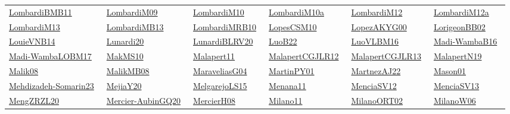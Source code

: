 \begin{longtable}{*{6}{l}}
\href{works/LombardiBMB11.pdf}{LombardiBMB11}~\cite{LombardiBMB11} & \href{works/LombardiM09.pdf}{LombardiM09}~\cite{LombardiM09} & \href{works/LombardiM10.pdf}{LombardiM10}~\cite{LombardiM10} & \href{works/LombardiM10a.pdf}{LombardiM10a}~\cite{LombardiM10a} & \href{works/LombardiM12.pdf}{LombardiM12}~\cite{LombardiM12} & \href{works/LombardiM12a.pdf}{LombardiM12a}~\cite{LombardiM12a}\\ 
\href{works/LombardiM13.pdf}{LombardiM13}~\cite{LombardiM13} & \href{}{LombardiMB13}~\cite{LombardiMB13} & \href{works/LombardiMRB10.pdf}{LombardiMRB10}~\cite{LombardiMRB10} & \href{works/LopesCSM10.pdf}{LopesCSM10}~\cite{LopesCSM10} & \href{works/LopezAKYG00.pdf}{LopezAKYG00}~\cite{LopezAKYG00} & \href{works/LorigeonBB02.pdf}{LorigeonBB02}~\cite{LorigeonBB02}\\ 
\href{works/LouieVNB14.pdf}{LouieVNB14}~\cite{LouieVNB14} & \href{works/Lunardi20.pdf}{Lunardi20}~\cite{Lunardi20} & \href{works/LunardiBLRV20.pdf}{LunardiBLRV20}~\cite{LunardiBLRV20} & \href{works/LuoB22.pdf}{LuoB22}~\cite{LuoB22} & \href{works/LuoVLBM16.pdf}{LuoVLBM16}~\cite{LuoVLBM16} & \href{works/Madi-WambaB16.pdf}{Madi-WambaB16}~\cite{Madi-WambaB16}\\ 
\href{works/Madi-WambaLOBM17.pdf}{Madi-WambaLOBM17}~\cite{Madi-WambaLOBM17} & \href{works/MakMS10.pdf}{MakMS10}~\cite{MakMS10} & \href{works/Malapert11.pdf}{Malapert11}~\cite{Malapert11} & \href{}{MalapertCGJLR12}~\cite{MalapertCGJLR12} & \href{works/MalapertCGJLR13.pdf}{MalapertCGJLR13}~\cite{MalapertCGJLR13} & \href{works/MalapertN19.pdf}{MalapertN19}~\cite{MalapertN19}\\ 
\href{works/Malik08.pdf}{Malik08}~\cite{Malik08} & \href{works/MalikMB08.pdf}{MalikMB08}~\cite{MalikMB08} & \href{works/MaraveliasG04.pdf}{MaraveliasG04}~\cite{MaraveliasG04} & \href{works/MartinPY01.pdf}{MartinPY01}~\cite{MartinPY01} & \href{}{MartnezAJ22}~\cite{MartnezAJ22} & \href{works/Mason01.pdf}{Mason01}~\cite{Mason01}\\ 
\href{works/Mehdizadeh-Somarin23.pdf}{Mehdizadeh-Somarin23}~\cite{Mehdizadeh-Somarin23} & \href{works/MejiaY20.pdf}{MejiaY20}~\cite{MejiaY20} & \href{works/MelgarejoLS15.pdf}{MelgarejoLS15}~\cite{MelgarejoLS15} & \href{works/Menana11.pdf}{Menana11}~\cite{Menana11} & \href{works/MenciaSV12.pdf}{MenciaSV12}~\cite{MenciaSV12} & \href{works/MenciaSV13.pdf}{MenciaSV13}~\cite{MenciaSV13}\\ 
\href{works/MengZRZL20.pdf}{MengZRZL20}~\cite{MengZRZL20} & \href{works/Mercier-AubinGQ20.pdf}{Mercier-AubinGQ20}~\cite{Mercier-AubinGQ20} & \href{works/MercierH08.pdf}{MercierH08}~\cite{MercierH08} & \href{}{Milano11}~\cite{Milano11} & \href{}{MilanoORT02}~\cite{MilanoORT02} & \href{works/MilanoW06.pdf}{MilanoW06}~\cite{MilanoW06}\\ 

\end{longtable}
